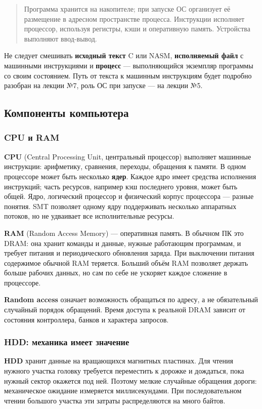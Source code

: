 \begin{quote}
Программа хранится на накопителе; при запуске ОС организует её размещение
в адресном пространстве процесса. Инструкции исполняет процессор, используя
регистры, кэши и оперативную память. Устройства выполняют ввод-вывод.
\end{quote}

Не следует смешивать \textbf{исходный текст} C или NASM, \textbf{исполняемый
файл} с машинными инструкциями и \textbf{процесс} --- выполняющийся экземпляр
программы со своим состоянием. Путь от текста к машинным инструкциям будет
подробно разобран на лекции №7, роль ОС при запуске --- на лекции №5.

\subsection{Компоненты компьютера}
\subsubsection*{CPU и RAM}
\textbf{CPU} (Central Processing Unit, центральный процессор) выполняет
машинные инструкции: арифметику, сравнения, переходы, обращения к памяти.
В одном процессоре может быть несколько \textbf{ядер}. Каждое ядро имеет
средства исполнения инструкций; часть ресурсов, например кэш последнего
уровня, может быть общей. Ядро, логический процессор и физический корпус
процессора --- разные понятия. SMT позволяет одному ядру поддерживать
несколько аппаратных потоков, но не удваивает все исполнительные ресурсы.

\textbf{RAM} (Random Access Memory) --- оперативная память. В обычном ПК это
DRAM: она хранит команды и данные, нужные работающим программам, и требует
питания и периодического обновления заряда. При выключении питания содержимое
обычной RAM теряется. Больший объём RAM позволяет держать больше рабочих
данных, но сам по себе не ускоряет каждое сложение в процессоре.

\textbf{Random access} означает возможность обращаться по адресу, а не
обязательный случайный порядок обращений. Время доступа к реальной DRAM
зависит от состояния контроллера, банков и характера запросов.

\subsubsection*{HDD: механика имеет значение}
\textbf{HDD} хранит данные на вращающихся магнитных пластинах. Для чтения
нужного участка головку требуется переместить к дорожке и дождаться, пока
нужный сектор окажется под ней. Поэтому мелкие случайные обращения дороги:
механическое ожидание измеряется миллисекундами. При последовательном чтении
большого участка эти затраты распределяются на много байтов.


